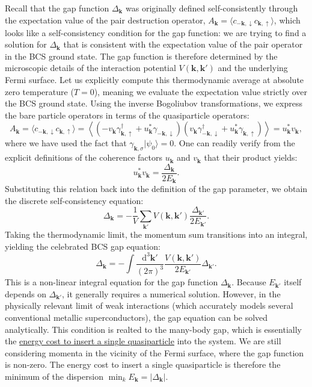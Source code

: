 Recall that the gap function \( \Delta_{\mathbf{k}} \) was originally defined self-consistently through the expectation value of the pair destruction operator, \( A_{\mathbf{k}} = \langle c_{-\mathbf{k},\downarrow} c_{\mathbf{k},\uparrow} \rangle \), which looks like a self-consistency condition for the gap function: we are trying to find a solution for \( \Delta_{\mathbf{k}} \) that is consistent with the expectation value of the pair operator in the BCS ground state. The gap function is therefore determined by the microscopic details of the interaction potential \( V(\mathbf{k}, \mathbf{k}') \) and the underlying Fermi surface. Let us explicitly compute this thermodynamic average at absolute zero temperature (\( T = 0 \)), meaning we evaluate the expectation value strictly over the BCS ground state. Using the inverse Bogoliubov transformations, we express the bare particle operators in terms of the quasiparticle operators:
\[
    A_{\mathbf{k}} = \langle c_{-\mathbf{k},\downarrow} c_{\mathbf{k},\uparrow} \rangle = \left\langle \left( -v_{\mathbf{k}} \gamma_{\mathbf{k},\uparrow}^\dagger + u_{\mathbf{k}}^* \gamma_{-\mathbf{k},\downarrow} \right) \left( v_{\mathbf{k}} \gamma_{-\mathbf{k},\downarrow}^\dagger + u_{\mathbf{k}}^* \gamma_{\mathbf{k},\uparrow} \right) \right\rangle = u_{\mathbf{k}}^* v_{\mathbf{k}},
\]
where we have used the fact that \( \gamma_{\mathbf{k},\sigma} |\psi_0\rangle = 0 \). One can readily verify from the explicit definitions of the coherence factors \( u_{\mathbf{k}} \) and \( v_{\mathbf{k}} \) that their product yields:
\[
    u_{\mathbf{k}}^* v_{\mathbf{k}} = \frac{\Delta_{\mathbf{k}}}{2E_{\mathbf{k}}}.
\]
Substituting this relation back into the definition of the gap parameter, we obtain the discrete self-consistency equation:
\[
    \Delta_{\mathbf{k}} = -\frac{1}{V} \sum_{\mathbf{k}'} V(\mathbf{k}, \mathbf{k}') \frac{\Delta_{\mathbf{k}'}}{2E_{\mathbf{k}'}}.
\]
Taking the thermodynamic limit, the momentum sum transitions into an integral, yielding the celebrated BCS gap equation:
\begin{equation} \label{eq:bcs_gap_equation}
    \Delta_{\mathbf{k}} = -\int \frac{\mathrm{d}^3\mathbf{k}'}{(2\pi)^3} \frac{V(\mathbf{k}, \mathbf{k}')}{2E_{\mathbf{k}'}} \Delta_{\mathbf{k}'}.
\end{equation}
This is a non-linear integral equation for the gap function \( \Delta_{\mathbf{k}} \). Because \( E_{\mathbf{k}'} \) itself depends on \( \Delta_{\mathbf{k}'} \), it generally requires a numerical solution. However, in the physically relevant limit of weak interactions (which accurately models several conventional metallic superconductors), the gap equation can be solved analytically. This condition is realted to the many-body gap, which is essentially the \uline{energy cost to insert a single quasiparticle} into the system. We are still considering momenta in the vicinity of the Fermi surface, where the gap function is non-zero. The energy cost to insert a single quasiparticle is therefore the minimum of the dispersion \( \min_k E_{\mathbf{k}} = |\Delta_{\mathbf{k}}| \).

